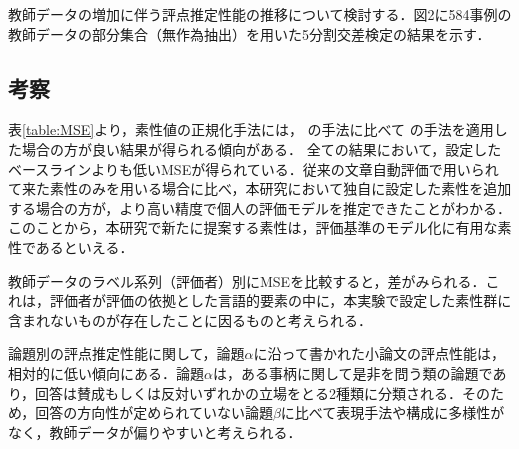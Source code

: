 \documentclass[japanese]{jnlp_1.5}
\newenvironment{iindent1zw}{}{}
\begin{document}
\noindent {}

\begin{iindent1zw}
教師データの増加に伴う評点推定性能の推移について検討する．図2に584事例の教師データの部分集合（無作為抽出）を用いた5分割交差検定の結果を示す．
\end{iindent1zw}



\subsection{考察}

\noindent {}

\begin{iindent1zw}
表\ref{table:MSE}より，素性値の正規化手法には，
の手法に比べて
の手法を適用した場合の方が良い結果が得られる傾向がある．
全ての結果において，設定したベースラインよりも低いMSEが得られている．従来の文章自動評価で用いられて来た素性のみを用いる場合に比べ，本研究において独自に設定した素性を追加する場合の方が，より高い精度で個人の評価モデルを推定できたことがわかる．このことから，本研究で新たに提案する素性は，評価基準のモデル化に有用な素性であるといえる．

教師データのラベル系列（評価者）別にMSEを比較すると，差がみられる．これは，評価者が評価の依拠とした言語的要素の中に，本実験で設定した素性群に含まれないものが存在したことに因るものと考えられる．

論題別の評点推定性能に関して，論題$\alpha$に沿って書かれた小論文の評点性能は，相対的に低い傾向にある．論題$\alpha$は，ある事柄に関して是非を問う類の論題であり，回答は賛成もしくは反対いずれかの立場をとる2種類に分類される．そのため，回答の方向性が定められていない論題$\beta$に比べて表現手法や構成に多様性がなく，教師データが偏りやすいと考えられる．
\end{iindent1zw}

\noindent {}
\end{document}
